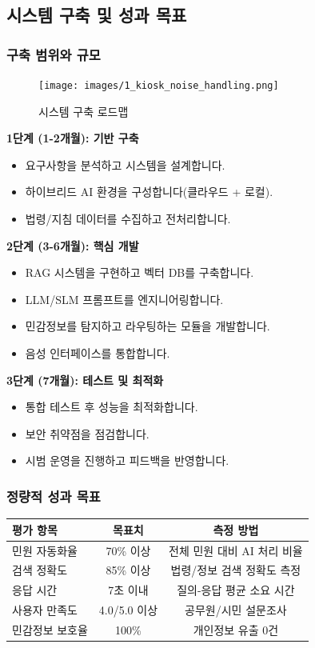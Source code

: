 \subsection{시스템 구축 및 성과 목표}

\subsubsection{구축 범위와 규모}

\begin{figure}[H]
    \centering
    \texttt{[image: images/1\_kiosk\_noise\_handling.png]}
    \caption{시스템 구축 로드맵}
    \label{fig:kiosk_noise_handling}
\end{figure}


\textbf{1단계 (1-2개월): 기반 구축}
\begin{itemize}
    \item 요구사항을 분석하고 시스템을 설계합니다.
    \item 하이브리드 AI 환경을 구성합니다(클라우드 + 로컬).
    \item 법령/지침 데이터를 수집하고 전처리합니다.
\end{itemize}

\textbf{2단계 (3-6개월): 핵심 개발}
\begin{itemize}
    \item RAG 시스템을 구현하고 벡터 DB를 구축합니다.
    \item LLM/SLM 프롬프트를 엔지니어링합니다.
    \item 민감정보를 탐지하고 라우팅하는 모듈을 개발합니다.
    \item 음성 인터페이스를 통합합니다.
\end{itemize}

\textbf{3단계 (7개월): 테스트 및 최적화}
\begin{itemize}
    \item 통합 테스트 후 성능을 최적화합니다.
    \item 보안 취약점을 점검합니다.
    \item 시범 운영을 진행하고 피드백을 반영합니다.
\end{itemize}

\subsubsection{정량적 성과 목표}

\begin{tabular}{|l|c|c|}
\hline
\textbf{평가 항목} & \textbf{목표치} & \textbf{측정 방법} \\
\hline
민원 자동화율 & 70\% 이상 & 전체 민원 대비 AI 처리 비율 \\
검색 정확도 & 85\% 이상 & 법령/정보 검색 정확도 측정 \\
응답 시간 & 7초 이내 & 질의-응답 평균 소요 시간 \\
사용자 만족도 & 4.0/5.0 이상 & 공무원/시민 설문조사 \\
민감정보 보호율 & 100\% & 개인정보 유출 0건 \\
\hline
\end{tabular}


